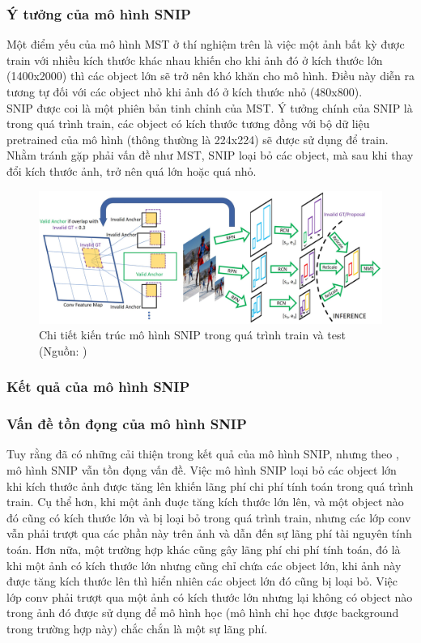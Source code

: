 {    \subsubsection{Ý tưởng của mô hình SNIP}
    Một điểm yếu của mô hình MST ở thí nghiệm trên là việc một ảnh bất kỳ được train với nhiều kích thước khác nhau khiến cho khi ảnh đó ở kích thước lớn (1400x2000) thì các object lớn sẽ trở nên khó khăn cho mô hình.
    Điều này diễn ra tương tự đối với các object nhỏ khi ảnh đó ở kích thước nhỏ (480x800). \\
    SNIP được coi là một phiên bản tinh chỉnh của MST.
    Ý tưởng chính của SNIP là trong quá trình train, các object có kích thước tương đồng với bộ dữ liệu pretrained của mô hình (thông thường là 224x224) sẽ được sử dụng để train.
    Nhằm tránh gặp phải vấn đề như  MST, SNIP loại bỏ các object, mà sau khi thay đổi kích thước ảnh, trở nên quá lớn hoặc quá nhỏ.
    \begin{figure}[H]
        \centering
        \includegraphics[width=16cm] {images/snip_model}
        \caption{Chi tiết kiến trúc mô hình SNIP trong quá trình train và test (Nguồn: \cite{singh2018analysis})}
        \label{fig:snip_model}
    \end{figure}

    \subsubsection{Kết quả của mô hình SNIP}
    \subsubsection{Vấn đề tồn đọng của mô hình SNIP}
    Tuy rằng đã có những cải thiện trong kết quả của mô hình SNIP, nhưng theo \cite{singh2018sniper}, mô hình SNIP vẫn tồn đọng vấn đề.
    Việc mô hình SNIP loại bỏ các object lớn khi kích thước ảnh được tăng lên khiến lãng phí chi phí tính toán trong quá trình train.
    Cụ thể hơn, khi một ảnh đuợc tăng kích thước lớn lên, và một object nào đó cũng có kích thước lớn và bị loại bỏ trong quá trình train, nhưng các lớp conv vẫn phải trượt qua các phần này trên ảnh và dẫn đến sự lãng phí tài nguyên tính toán.
    Hơn nữa, một trường hợp khác cũng gây lãng phí chi phí tính toán, đó là khi một ảnh có kích thước lớn nhưng cũng chỉ chứa các object lớn, khi ảnh này được tăng kích thước lên thì hiển nhiên các object lớn đó cũng bị loại bỏ.
    Việc lớp conv phải trượt qua một ảnh có kích thước lớn nhưng lại không có object nào trong ảnh đó được sử dụng để mô hình học (mô hình chỉ học được background trong trường hợp này) chắc chắn là một sự lãng phí.

}
